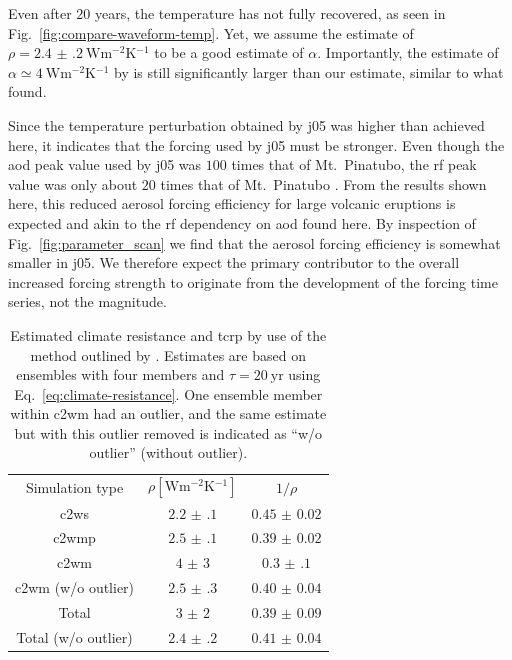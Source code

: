 \documentclass{ametsocV6.1}
\begin{document}
Even after \(20\) years, the temperature has not fully recovered, as seen in
Fig.~\ref{fig:compare-waveform-temp}. Yet, we assume the estimate of \(\rho
=\SI{2.4(2)}{\watt\metre^{-2}\kelvin^{-1}}\) to be a good estimate of \(\alpha \).
Importantly, the estimate of \(\alpha \simeq \SI{4}{\watt\metre^{-2}\kelvin^{-1}}\) by
\citet{jones2005} is still significantly larger than our estimate, similar to what
\citet{gregory2016} found.

Since the temperature perturbation obtained by \gls{j05} was higher than achieved here,
it indicates that the forcing used by \gls{j05} must be stronger. Even though the
\gls{aod} peak value used by \gls{j05} was \(100\) times that of Mt.\ Pinatubo, the
\gls{rf} peak value was only about \(20\) times that of Mt.\ Pinatubo
\citep{gregory2016}. From the results shown here, this reduced aerosol forcing
efficiency for large volcanic eruptions is expected and akin to the \gls{rf} dependency
on \gls{aod} found here. By inspection of Fig.~\ref{fig:parameter_scan} we find that the
aerosol forcing efficiency is somewhat smaller in \gls{j05}. We therefore expect the
primary contributor to the overall increased forcing strength to originate from the
development of the forcing time series, not the magnitude.

\begin{table}
  \centering

  \caption{Estimated climate resistance and \gls{tcrp} by use of the method outlined by
    \citet{merlis2014}. Estimates are based on ensembles with four members and \(\tau
    =\SI{20}{\mathrm{yr}}\) using Eq.~\ref{eq:climate-resistance}. One ensemble member
    within \gls{c2wm} had an outlier, and the same estimate but with this outlier removed is
    indicated as ``w/o outlier'' (without outlier).}\label{tab:trcp}%
  \begin{tabular}{ccc}
    Simulation type          & \(\rho [\si{\watt\metre^{-2}\kelvin^{-1}}]\) & \(1/\rho\)        \\
    \gls{c2ws}               & \(\num{2.2(1)}\)                             & \(\num{0.45(2)}\) \\
    \gls{c2wmp}              & \(\num{2.5(1)}\)                             & \(\num{0.39(2)}\) \\
    \gls{c2wm}               & \(\num{4(3)}\)                               & \(\num{0.3(1)}\)  \\
    \gls{c2wm} (w/o outlier) & \(\num{2.5(3)}\)                             & \(\num{0.40(4)}\) \\
    Total                    & \(\num{3(2)}\)                               & \(\num{0.39(9)}\) \\
    Total (w/o outlier)      & \(\num{2.4(2)}\)                             & \(\num{0.41(4)}\) \\
  \end{tabular}
\end{table}
\end{document}
